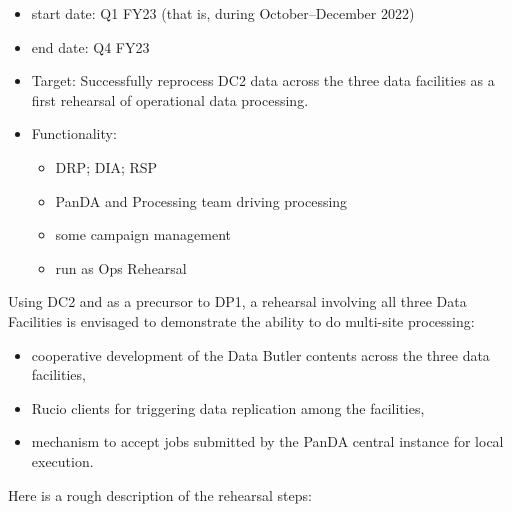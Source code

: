 \begin{itemize}

\item start date: Q1 \gls{FY23} (that is, during October--December 2022)

\item end date: Q4 \gls{FY23}

\item Target: Successfully reprocess \gls{DC2} data across the three data facilities as a first rehearsal of operational data processing.

\item Functionality:

  \begin{itemize}
    
  \item \gls{DRP}; \gls{DIA}; \gls{RSP}

  \item \gls{PanDA} and Processing team driving processing

  \item some campaign management

  \item run as Ops Rehearsal

  \end{itemize}
  
\end{itemize}

Using DC2 and as a precursor to DP1, a rehearsal involving all three Data Facilities is envisaged to demonstrate the ability to do multi-site processing:

\begin{itemize}
  
\item cooperative development of the Data Butler contents across the three data facilities,
  
\item Rucio clients for triggering data replication among the facilities,
  
\item mechanism to accept jobs submitted by the PanDA central instance for local execution.
  
\end{itemize}

Here is a rough description of the rehearsal steps:

